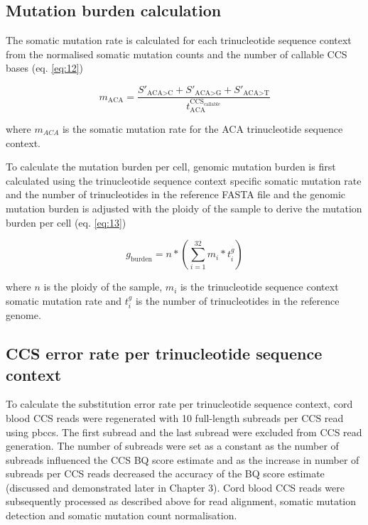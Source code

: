 \subsection{Mutation burden calculation}

The somatic mutation rate is calculated for each trinucleotide sequence context from the normalised somatic mutation counts and the number of callable CCS bases (eq. \ref{eq:12})

\begin{equation} \label{eq:12}
m_{\text{ACA}} = \frac{S'_{\text{ACA>C}} + S'_{\text{ACA>G}} + S'_{\text{ACA>T}}}{t^{\text{CCS}_{\text{callable}}}_{\text{ACA}}} 
\end{equation}

where $m_{ACA}$ is the somatic mutation rate for the ACA trinucleotide sequence context. 

To calculate the mutation burden per cell, genomic mutation burden is first calculated using the trinucleotide sequence context specific somatic mutation rate and the number of trinucleotides in the reference FASTA file and the genomic mutation burden is adjusted with the ploidy of the sample to derive the mutation burden per cell (eq. \ref{eq:13})

\begin{equation} \label{eq:13}
g_{\text{burden}} = n * (\sum^{32}_{i=1} m_{i} * t^{g}_{i})
\end{equation}

where $n$ is the ploidy of the sample, $m_{i}$ is the trinucleotide sequence context somatic mutation rate and $t^{g}_{i}$ is the number of trinucleotides in the reference genome.

\subsection{CCS error rate per trinucleotide sequence context}

To calculate the substitution error rate per trinucleotide sequence context, cord blood CCS reads were regenerated with 10 full-length subreads per CCS read using pbccs. The first subread and the last subread were excluded from CCS read generation. The number of subreads were set as a constant as the number of subreads influenced the CCS BQ score estimate and as the increase in number of subreads per CCS reads decreased the accuracy of the BQ score estimate (discussed and demonstrated later in Chapter 3). Cord blood CCS reads were subsequently processed as described above for read alignment, somatic mutation detection and somatic mutation count normalisation.

